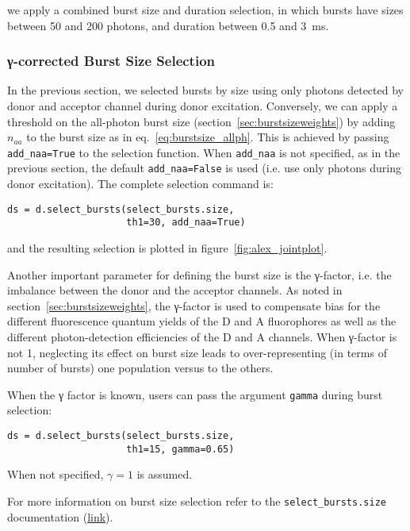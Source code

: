 we apply a combined burst size and duration selection, in which bursts
have sizes between 50 and 200 photons, and duration between 0.5 and 3~ms.

\subsubsection{γ-corrected Burst Size Selection}

In the previous section, we selected bursts by size using only photons
detected by donor and acceptor channel during donor excitation.
Conversely, we can apply a threshold on the all-photon burst size 
(section~\ref{sec:burstsizeweights}) by adding $n_{aa}$ to the burst size
as in eq.~\ref{eq:burstsize_allph}. This is achieved
by passing \verb|add_naa=True| to the selection function. When \verb|add_naa| is not specified,
as in the previous section, the default \verb|add_naa=False| is used
(i.e. use only photons during donor excitation). The complete selection command
is:

\begin{lstlisting}
ds = d.select_bursts(select_bursts.size,
                     th1=30, add_naa=True)
\end{lstlisting}

\noindent and the resulting selection is plotted in figure~\ref{fig:alex_jointplot}.

Another important parameter for defining the burst size is the γ-factor, i.e.
the imbalance between the donor and the acceptor channels. As noted in
section~\ref{sec:burstsizeweights}, the γ-factor is
used to compensate bias for the different fluorescence quantum yields of the D and A
fluorophores as well as the different photon-detection efficiencies of the D and A channels.
When γ-factor is not 1, neglecting its effect on burst size leads to
over-representing (in terms of number of bursts) one population versus to the others.

When the γ factor is known, users can pass the argument 
\verb|gamma| during burst selection:

\begin{lstlisting}
ds = d.select_bursts(select_bursts.size,
                     th1=15, gamma=0.65)
\end{lstlisting}

When not specified, $\gamma=1$ is assumed.

For more information on burst size selection refer to the
\verb|select_bursts.size| documentation
(\href{http://fretbursts.readthedocs.org/en/latest/burst_selection.html#fretbursts.select_bursts.size}{link}). 

